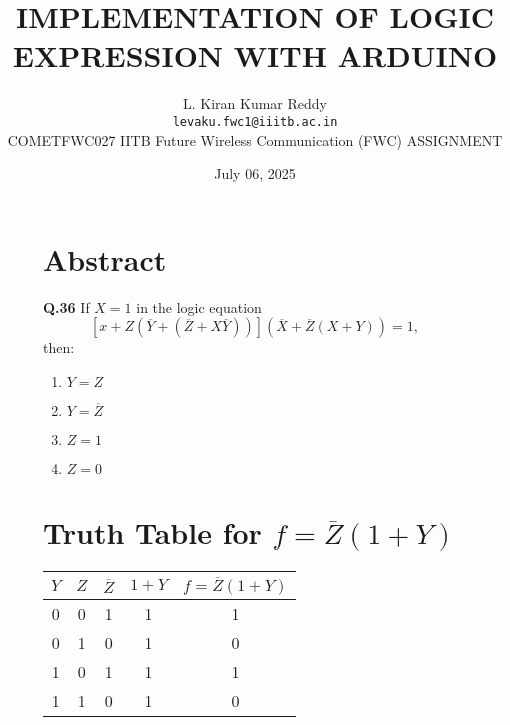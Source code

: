 \documentclass[12pt,a4paper]{article}
\title{\textbf{IMPLEMENTATION OF LOGIC EXPRESSION WITH ARDUINO}}
\author{L. Kiran Kumar Reddy \\ \texttt{levaku.fwc1@iiitb.ac.in} \\
 \hspace{-0.3cm}COMETFWC027\hspace{0.5cm} IITB Future Wireless Communication (FWC)\hspace{0.4cm} ASSIGNMENT}
\date{July 06, 2025}
\begin{document}
\maketitle



\begin{figure}[H]
  \centering
  \begin{minipage}[t]{0.48\textwidth}
    \section*{Abstract}
    \small
    \noindent\textbf{Q.36} \quad If $X = 1$ in the logic equation 
    \[
    \left[x + Z \left( \overline{Y} + (\overline{Z} + X\overline{Y}) \right) \right] 
    \left( \overline{X} + \overline{Z}(X + Y) \right) = 1,
    \]
    then:

    \begin{enumerate}[label=(\Alph*)]
        \item $Y = Z$
        \item $Y = \overline{Z}$
        \item $Z = 1$
        \item $Z = 0$
    \end{enumerate}

    \vspace{0.3cm}
    \section*{Truth Table for $f = \overline{Z}(1 + Y)$}
    \renewcommand{\arraystretch}{1.2}
    \begin{tabular}{|c|c|c|c|c|}
    \hline
    $Y$ & $Z$ & $\overline{Z}$ & $1 + Y$ & $f = \overline{Z}(1 + Y)$ \\
    \hline
    0 & 0 & 1 & 1 & 1 \\
    0 & 1 & 0 & 1 & 0 \\
    1 & 0 & 1 & 1 & 1 \\
    1 & 1 & 0 & 1 & 0 \\
    \hline
    \end{tabular}
  \end{minipage}\hfill
  \begin{minipage}[t]{0.48\textwidth}

\end{minipage}
\end{figure}
\end{document}
